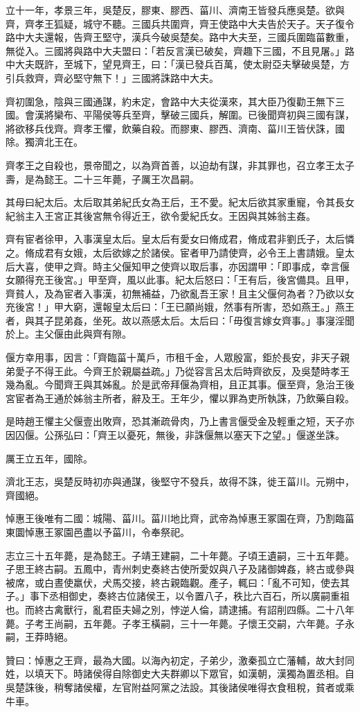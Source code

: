 \begin{pinyinscope}
立十一年，孝景三年，吳楚反，膠東、膠西、菑川、濟南王皆發兵應吳楚。欲與齊，齊孝王狐疑，城守不聽。三國兵共圍齊，齊王使路中大夫告於天子。天子復令路中大夫還報，告齊王堅守，漢兵今破吳楚矣。路中大夫至，三國兵圍臨菑數重，無從入。三國將與路中大夫盟曰：「若反言漢已破矣，齊趣下三國，不且見屠。」路中大夫既許，至城下，望見齊王，曰：「漢已發兵百萬，使太尉亞夫擊破吳楚，方引兵救齊，齊必堅守無下！」三國將誅路中大夫。

齊初圍急，陰與三國通謀，約未定，會路中大夫從漢來，其大臣乃復勸王無下三國。會漢將欒布、平陽侯等兵至齊，擊破三國兵，解圍。已後聞齊初與三國有謀，將欲移兵伐齊。齊孝王懼，飲藥自殺。而膠東、膠西、濟南、菑川王皆伏誅，國除。獨濟北王在。

齊孝王之自殺也，景帝聞之，以為齊首善，以迫劫有謀，非其罪也，召立孝王太子壽，是為懿王。二十三年薨，子厲王次昌嗣。

其母曰紀太后。太后取其弟紀氏女為王后，王不愛。紀太后欲其家重寵，令其長女紀翁主入王宮正其後宮無令得近王，欲令愛紀氏女。王因與其姊翁主姦。

齊有宦者徐甲，入事漢皇太后。皇太后有愛女曰脩成君，脩成君非劉氏子，太后憐之。脩成君有女娥，太后欲嫁之於諸侯。宦者甲乃請使齊，必令王上書請娥。皇太后大喜，使甲之齊。時主父偃知甲之使齊以取后事，亦因謂甲：「即事成，幸言偃女願得充王後宮。」甲至齊，風以此事。紀太后怒曰：「王有后，後宮備具。且甲，齊貧人，及為宦者入事漢，初無補益，乃欲亂吾王家！且主父偃何為者？乃欲以女充後宮！」甲大窮，還報皇太后曰：「王已願尚娥，然事有所害，恐如燕王。」燕王者，與其子昆弟姦，坐死。故以燕感太后。太后曰：「毋復言嫁女齊事。」事寖淫聞於上。主父偃由此與齊有隙。

偃方幸用事，因言：「齊臨菑十萬戶，巿租千金，人眾殷富，鉅於長安，非天子親弟愛子不得王此。今齊王於親屬益疏。」乃從容言呂太后時齊欲反，及吳楚時孝王幾為亂。今聞齊王與其姊亂。於是武帝拜偃為齊相，且正其事。偃至齊，急治王後宮宦者為王通於姊翁主所者，辭及王。王年少，懼以罪為吏所執誅，乃飲藥自殺。

是時趙王懼主父偃壹出敗齊，恐其漸疏骨肉，乃上書言偃受金及輕重之短，天子亦因囚偃。公孫弘曰：「齊王以憂死，無後，非誅偃無以塞天下之望。」偃遂坐誅。

厲王立五年，國除。

濟北王志，吳楚反時初亦與通謀，後堅守不發兵，故得不誅，徙王菑川。元朔中，齊國絕。

悼惠王後唯有二國：城陽、菑川。菑川地比齊，武帝為悼惠王冢園在齊，乃割臨菑東圜悼惠王冢園邑盡以予菑川，令奉祭祀。

志立三十五年薨，是為懿王。子靖王建嗣，二十年薨。子頃王遺嗣，三十五年薨。子思王終古嗣。五鳳中，青州刺史奏終古使所愛奴與八子及諸御婢姦，終古或參與被席，或白晝使羸伏，犬馬交接，終古親臨觀。產子，輒曰：「亂不可知，使去其子。」事下丞相御史，奏終古位諸侯王，以令置八子，秩比六百石，所以廣嗣重祖也。而終古禽獸行，亂君臣夫婦之別，悖逆人倫，請逮捕。有詔削四縣。二十八年薨。子考王尚嗣，五年薨。子孝王橫嗣，三十一年薨。子懷王交嗣，六年薨。子永嗣，王莽時絕。

贊曰：悼惠之王齊，最為大國。以海內初定，子弟少，激秦孤立亡藩輔，故大封同姓，以填天下。時諸侯得自除御史大夫群卿以下眾官，如漢朝，漢獨為置丞相。自吳楚誅後，稍奪諸侯權，左官附益阿黨之法設。其後諸侯唯得衣食租稅，貧者或乘牛車。


\end{pinyinscope}